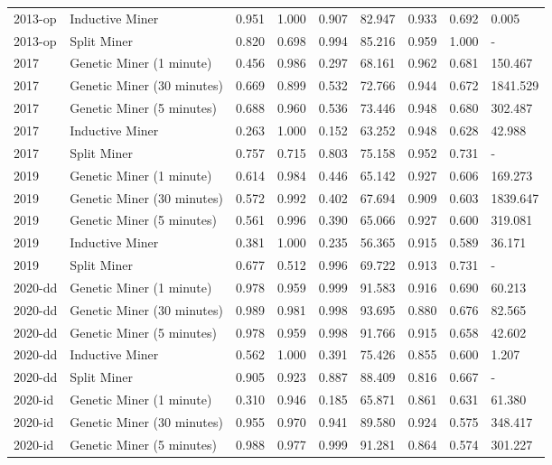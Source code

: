 \begin{tabular}{llrrrrrrl}
2013-op & Inductive Miner & 0.951 & 1.000 & 0.907 & 82.947 & 0.933 & 0.692 & 0.005 \\
2013-op & Split Miner & 0.820 & 0.698 & 0.994 & 85.216 & 0.959 & 1.000 & - \\
2017 & Genetic Miner (1 minute) & 0.456 & 0.986 & 0.297 & 68.161 & 0.962 & 0.681 & 150.467 \\
2017 & Genetic Miner (30 minutes) & 0.669 & 0.899 & 0.532 & 72.766 & 0.944 & 0.672 & 1841.529 \\
2017 & Genetic Miner (5 minutes) & 0.688 & 0.960 & 0.536 & 73.446 & 0.948 & 0.680 & 302.487 \\
2017 & Inductive Miner & 0.263 & 1.000 & 0.152 & 63.252 & 0.948 & 0.628 & 42.988 \\
2017 & Split Miner & 0.757 & 0.715 & 0.803 & 75.158 & 0.952 & 0.731 & - \\
2019 & Genetic Miner (1 minute) & 0.614 & 0.984 & 0.446 & 65.142 & 0.927 & 0.606 & 169.273 \\
2019 & Genetic Miner (30 minutes) & 0.572 & 0.992 & 0.402 & 67.694 & 0.909 & 0.603 & 1839.647 \\
2019 & Genetic Miner (5 minutes) & 0.561 & 0.996 & 0.390 & 65.066 & 0.927 & 0.600 & 319.081 \\
2019 & Inductive Miner & 0.381 & 1.000 & 0.235 & 56.365 & 0.915 & 0.589 & 36.171 \\
2019 & Split Miner & 0.677 & 0.512 & 0.996 & 69.722 & 0.913 & 0.731 & - \\
2020-dd & Genetic Miner (1 minute) & 0.978 & 0.959 & 0.999 & 91.583 & 0.916 & 0.690 & 60.213 \\
2020-dd & Genetic Miner (30 minutes) & 0.989 & 0.981 & 0.998 & 93.695 & 0.880 & 0.676 & 82.565 \\
2020-dd & Genetic Miner (5 minutes) & 0.978 & 0.959 & 0.998 & 91.766 & 0.915 & 0.658 & 42.602 \\
2020-dd & Inductive Miner & 0.562 & 1.000 & 0.391 & 75.426 & 0.855 & 0.600 & 1.207 \\
2020-dd & Split Miner & 0.905 & 0.923 & 0.887 & 88.409 & 0.816 & 0.667 & - \\
2020-id & Genetic Miner (1 minute) & 0.310 & 0.946 & 0.185 & 65.871 & 0.861 & 0.631 & 61.380 \\
2020-id & Genetic Miner (30 minutes) & 0.955 & 0.970 & 0.941 & 89.580 & 0.924 & 0.575 & 348.417 \\
2020-id & Genetic Miner (5 minutes) & 0.988 & 0.977 & 0.999 & 91.281 & 0.864 & 0.574 & 301.227 \\

\end{tabular}
